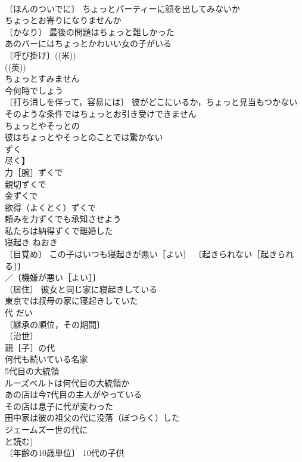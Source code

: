\documentclass[8pt]{extreport}
\begin{document}
\begin{CJK}{UTF8}{min}
\\	〔ほんのついでに〕 ちょっとパーティーに顔を出してみないか 
\\	ちょっとお寄りになりませんか 
\\	〔かなり〕 最後の問題はちょっと難しかった 
\\	あのバーにはちょっとかわいい女の子がいる 
\\	〔呼び掛け〕((米)) 
\\	((英)) 
\\	ちょっとすみません
\\	今何時でしょう 
\\	〔打ち消しを伴って，容易には〕 彼がどこにいるか，ちょっと見当もつかない 
\\	そのような条件ではちょっとお引き受けできません 
\\	ちょっとやそっとの　
\\	彼はちょっとやそっとのことでは驚かない 
\\	ずく	
\\	尽く】	
\\	力［腕］ずくで 
\\	親切ずくで 
\\	金ずくで 
\\	欲得（よくとく）ずくで 
\\	頼みを力ずくでも承知させよう 
\\	私たちは納得ずくで離婚した 
\\	寝起き	ねおき	
\\	〔目覚め〕 この子はいつも寝起きが悪い［よい］ 〔起きられない［起きられる］〕
\\	／〔機嫌が悪い［よい］〕
\\	〔居住〕 彼女と同じ家に寝起きしている 
\\	東京では叔母の家に寝起きしていた 
\\	代	だい	
\\	〔継承の順位，その期間〕
\\	〔治世〕
\\	親［子］の代 
\\	何代も続いている名家 
\\	5代目の大統領 
\\	ルーズベルトは何代目の大統領か 
\\	あの店は今7代目の主人がやっている 
\\	その店は息子に代が変わった 
\\	田中家は彼の祖父の代に没落（ぼつらく）した 
\\	ジェームズ一世の代に 
\\	と読む) 
\\	〔年齢の10歳単位〕 10代の子供 

\end{CJK}
\end{document}

